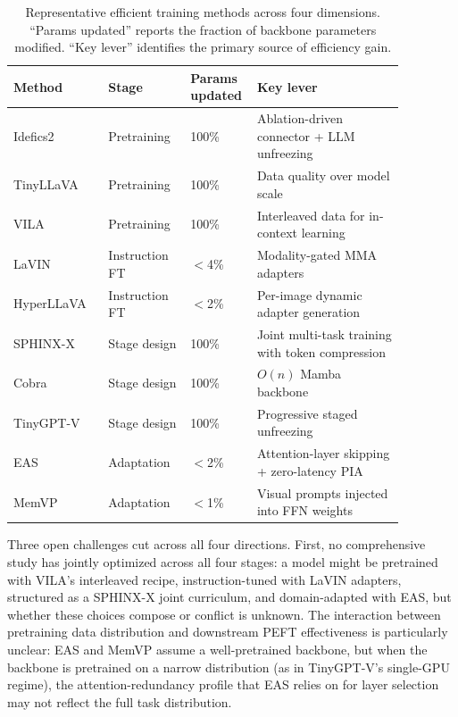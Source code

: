 \begin{table}[t]
  \caption{Representative efficient training methods across four dimensions. ``Params updated'' reports the fraction of backbone parameters modified. ``Key lever'' identifies the primary source of efficiency gain.}
  \label{tab:training-compare}
  \small
  \setlength{\tabcolsep}{4pt}
  \begin{tabular}{@{}p{0.17\linewidth}p{0.20\linewidth}p{0.14\linewidth}p{0.36\linewidth}@{}}
    \toprule
    Method & Stage & Params updated & Key lever \\
    \midrule
    Idefics2~\cite{Laurençon202402246}   & Pretraining      & 100\%   & Ablation-driven connector + LLM unfreezing \\
    TinyLLaVA~\cite{Zhou202402289}       & Pretraining      & 100\%   & Data quality over model scale \\
    VILA~\cite{Lin202312533}             & Pretraining      & 100\%   & Interleaved data for in-context learning \\
    LaVIN~\cite{Luo202315023}            & Instruction FT   & $<$4\%  & Modality-gated MMA adapters \\
    HyperLLaVA~\cite{Wen202403447}       & Instruction FT   & $<$2\%  & Per-image dynamic adapter generation \\
    SPHINX-X~\cite{Gao202402935}         & Stage design     & 100\%   & Joint multi-task training with token compression \\
    Cobra~\cite{Zhao202403520}           & Stage design     & 100\%   & $O(n)$ Mamba backbone \\
    TinyGPT-V~\cite{Yuan202316862}       & Stage design     & 100\%   & Progressive staged unfreezing \\
    EAS~\cite{Wu202415226}               & Adaptation       & $<$2\%  & Attention-layer skipping + zero-latency PIA \\
    MemVP~\cite{Jie202405615}            & Adaptation       & $<$1\%  & Visual prompts injected into FFN weights \\
    \bottomrule
  \end{tabular}
\end{table}

Three open challenges cut across all four directions. First, no comprehensive study has jointly optimized across all four stages: a model might be pretrained with VILA's interleaved recipe, instruction-tuned with LaVIN adapters, structured as a SPHINX-X joint curriculum, and domain-adapted with EAS, but whether these choices compose or conflict is unknown. The interaction between pretraining data distribution and downstream PEFT effectiveness is particularly unclear: EAS and MemVP assume a well-pretrained backbone, but when the backbone is pretrained on a narrow distribution (as in TinyGPT-V's single-GPU regime), the attention-redundancy profile that EAS relies on for layer selection may not reflect the full task distribution.

